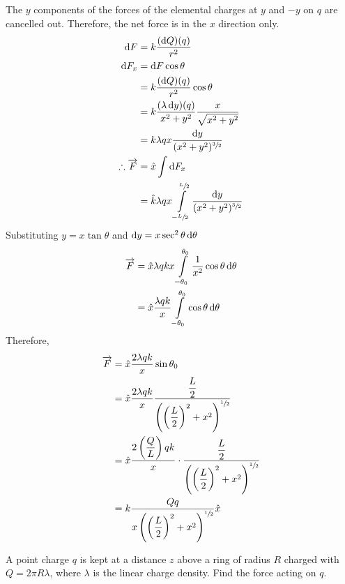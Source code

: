 \documentclass[fleqn, a4paper, 12pt, twoside]{article}
\theoremstyle{definition}
\theoremstyle{theorem}
\begin{document}
\begin{solution}
\begin{figure}[H]
	\end{figure}
	The $y$ components of the forces of the elemental charges at $y$ and $-y$ on $q$ are cancelled out. Therefore, the net force is in the $x$ direction only.
	\begin{align*}
		\dif F &= k \dfrac{(\dif Q) (q)}{r^2}\\
		\dif F_x &= \dif F \cos \theta\\
		&= k \dfrac{(\dif Q) (q)}{r^2} \cos \theta\\
		&= k \dfrac{(\lambda \dif y) (q)}{x^2 + y^2} \dfrac{x}{\sqrt{x^2 + y^2}}\\
		&= k \lambda q x \dfrac{\dif y}{(x^2 + y^2)^{\sfrac{3}{2}}}\\
		\therefore \overrightarrow{F} &= \hat{x} \int \dif F_x\\
		&= \hat{k} \lambda q x \int\limits_{-\sfrac{L}{2}}^{\sfrac{L}{2}} \dfrac{\dif y}{(x^2 + y^2)^{\sfrac{3}{2}}}
	\end{align*}
		Substituting $y = x \tan \theta$ and $\dif y = x \sec^2 \theta \dif \theta$
	\begin{align*}
		\overrightarrow{F} &= \hat{x} \lambda q k x \int\limits_{-\theta_0}^{\theta_0} \dfrac{1}{x^2} \cos \theta \dif \theta\\
		&= \hat{x} \dfrac{\lambda q k}{x} \int\limits_{-\theta_0}^{\theta_0} \cos \theta \dif \theta
	\end{align*}
		Therefore,
	\begin{align*}
		\overrightarrow{F} &= \hat{x} \dfrac{2 \lambda q k}{x} \sin \theta_0\\
		&= \hat{x} \dfrac{2 \lambda q k}{x} \dfrac{\dfrac{L}{2}}{\left( \left( \dfrac{L}{2} \right)^2 + x^2 \right)^{\sfrac{1}{2}}}\\
		&= \hat{x} \dfrac{2 \left( \dfrac{Q}{L} \right) q k}{x} \cdot  \dfrac{\dfrac{L}{2}}{\left( \left( \dfrac{L}{2} \right)^2 + x^2 \right)^{\sfrac{1}{2}}}\\
		&= k \dfrac{Q q}{x \left( \left( \dfrac{L}{2} \right)^2 + x^2 \right)^{\sfrac{1}{2}}} \hat{x}
	\end{align*}
\end{solution}

\begin{question}
	A point charge $q$ is kept at a distance $z$ above a ring of radius $R$ charged with $Q = 2 \pi R \lambda$, where $\lambda$ is the linear charge density. Find the force acting on $q$.
\end{question}
\end{document}
